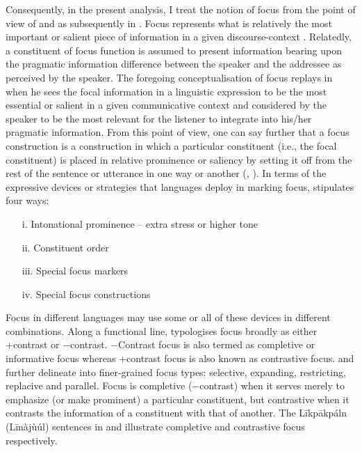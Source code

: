 \documentclass[output=paper,colorlinks,citecolor=brown]{langscibook}
\begin{document}
Consequently, in the present analysis, I treat the notion of focus from the point of view of \citet{Dik1981} and as subsequently in \citet{Dik1997}. Focus represents what is relatively the most important or salient piece of information in a given discourse-context \citep[42]{Dik1981}. Relatedly, a constituent of focus function is assumed to present information bearing upon the pragmatic information difference between the speaker and the addressee as perceived by the speaker. The foregoing conceptualisation of focus replays in \citet[326]{Dik1997} when he sees the focal information in a linguistic expression to be the most essential or salient in a given communicative context and considered by the speaker to be the most relevant for the listener to integrate into his/her pragmatic information. From this point of view, one can say further that a focus construction is a construction in which a particular constituent (i.e., the focal constituent) is placed in relative prominence or saliency by setting it off from the rest of the sentence or utterance in one way or another (\citealt{Boadi1974, DrubigSchaffer2001}, \citealt[185]{MarfoBodomo2005}). In terms of the expressive devices or strategies that languages deploy in marking focus, \citet[43]{Dik1981} stipulates four ways:

\begin{itemize}
    \item[i.] Intonational prominence – extra stress or higher tone
    \item[ii.] Constituent order
    \item [iii.] Special focus markers
    \item [iv.] Special focus constructions
\end{itemize}

Focus in different languages may use some or all of these devices in different combinations. Along a functional line, \citet[60]{Dik1981} typologises focus broadly as either +contrast or −contrast. −Contrast focus is also termed as completive or informative focus whereas +contrast focus is also known as contrastive focus. \citet{Akrofi-Ansah2014, Schwarz2009} and \citet{SkopeteasEtAl2006} further delineate into finer-grained focus types: selective, expanding, restricting, replacive and parallel. Focus is completive (−contrast) when it serves merely to emphasize (or make prominent) a particular constituent, but contrastive when it contrasts the information of a constituent with that of another. The Līkpākpáln (Līnàjùúl) sentences in  and  illustrate completive and contrastive focus respectively.
\end{document}
